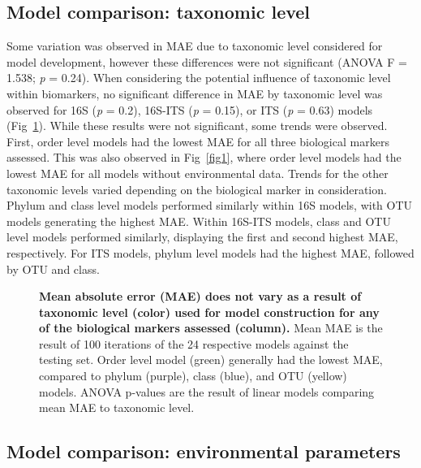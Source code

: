 \documentclass[
  10pt,
  letterpaper,
]{article}
\begin{document}
\hypertarget{model-comparison-taxonomic-level}{%
\subsection{Model comparison: taxonomic
level}\label{model-comparison-taxonomic-level}}

Some variation was observed in MAE due to taxonomic level considered for
model development, however these differences were not significant (ANOVA
F = 1.538; \emph{p} = 0.24). When considering the potential influence of
taxonomic level within biomarkers, no significant difference in MAE by
taxonomic level was observed for 16S (\emph{p} = 0.2), 16S-ITS (\emph{p}
= 0.15), or ITS (\emph{p} = 0.63) models (Fig~\ref{fig4}). While these
results were not significant, some trends were observed. First, order
level models had the lowest MAE for all three biological markers
assessed. This was also observed in Fig~\ref{fig1}, where order level
models had the lowest MAE for all models without environmental data.
Trends for the other taxonomic levels varied depending on the biological
marker in consideration. Phylum and class level models performed
similarly within 16S models, with OTU models generating the highest MAE.
Within 16S-ITS models, class and OTU level models performed similarly,
displaying the first and second highest MAE, respectively. For ITS
models, phylum level models had the highest MAE, followed by OTU and
class.

\begin{figure}[!h]
\caption{{\bf Mean absolute error (MAE) does not vary as a result of taxonomic level (color) used for model construction for any of the biological markers assessed (column).}
Mean MAE is the result of 100 iterations of the 24 respective models against the testing set. Order level model (green) generally had the lowest MAE, compared to phylum (purple), class (blue), and OTU (yellow) models. ANOVA p-values are the result of linear models comparing mean MAE to taxonomic level.}
\label{fig4}
\end{figure}

\hypertarget{model-comparison-environmental-parameters}{%
\subsection{Model comparison: environmental
parameters}\label{model-comparison-environmental-parameters}}
\end{document}
